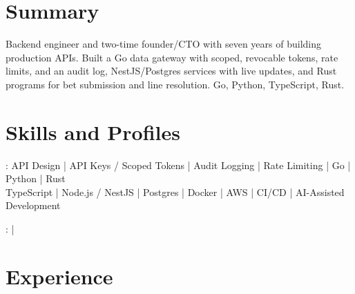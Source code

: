 \documentclass[print]{jack-resume}
\begin{document}
\pagecolor{darkmodeBackground}


\begin{minipage}[t][1cm][t]{.03\textwidth}
    \hfill
\end{minipage}

\section{Summary}
Backend engineer and two-time founder/CTO with seven years of building production APIs. Built a Go data gateway with scoped, revocable tokens, rate limits, and an audit log, NestJS/Postgres services with live updates, and Rust programs for bet submission and line resolution. Go, Python, TypeScript, Rust.
\sectionsep

\section{Skills and Profiles}
:
API Design \hfill | \hfill
API Keys / Scoped Tokens \hfill | \hfill
Audit Logging \hfill | \hfill
Rate Limiting \hfill | \hfill
Go \hfill | \hfill
Python \hfill | \hfill
Rust \\
\hspace{1.0cm} TypeScript \hfill | \hfill
Node.js / NestJS \hfill | \hfill
Postgres \hfill | \hfill
Docker \hfill | \hfill
AWS \hfill | \hfill
CI/CD \hfill | \hfill
AI-Assisted Development \\

\raggedright{
    :
      \href{https://www.linkedin.com/in/jack-sturtevant/}{ \ExternalLink} |
     \href{https://github.com/jacksturt}{ \ExternalLink}}

\section{Experience}
\end{document}
